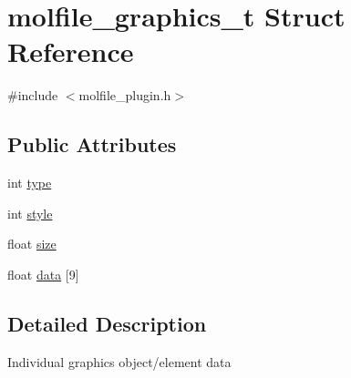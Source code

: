 \hypertarget{structmolfile__graphics__t}{\section{molfile\-\_\-graphics\-\_\-t \-Struct \-Reference}
\label{structmolfile__graphics__t}
}


{\ttfamily \#include $<$molfile\-\_\-plugin.\-h$>$}

\subsection*{\-Public \-Attributes}
\begin{DoxyCompactItemize}
\item 
int \hyperlink{structmolfile__graphics__t_a501b87407c7f2b5b6bb47c714af4257f}{type}
\item 
int \hyperlink{structmolfile__graphics__t_aa349ed7acdfcc222d68688afa0fd067d}{style}
\item 
float \hyperlink{structmolfile__graphics__t_a86757f8482e21fd16d06c72155f4f166}{size}
\item 
float \hyperlink{structmolfile__graphics__t_a318d4546a3d423317a4a40a2a03458f3}{data} \mbox{[}9\mbox{]}
\end{DoxyCompactItemize}


\subsection{\-Detailed \-Description}
\-Individual graphics object/element data 

